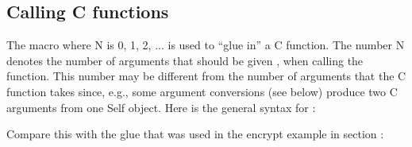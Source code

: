 \documentclass[letterpaper,10pt,english]{sphinxmanual}
\begin{document}

\subsection{Calling C functions}
\label{\detokenize{vmref:calling-c-functions}}\label{\detokenize{vmref:index-71}}
The macro  where N is 0, 1, 2, ... is used to “glue in” a C function. The number N denotes
the number of arguments that should be given , when calling the function. This
number may be different from the number of arguments that the C function takes since, e.g., some
argument conversions (see below) produce two C arguments from one Self object. Here is the
general syntax for :

\begin{sphinxVerbatim}[commandchars=\\\{\}]
      
\end{sphinxVerbatim}

Compare this with the glue that was used in the encrypt example in section {\hyperref[\detokenize{vmref:a-simple-glue-example-calling-a-c-function}]{}}:

\begin{sphinxVerbatim}[commandchars=\\\{\}]
    
\end{sphinxVerbatim}
\end{document}
